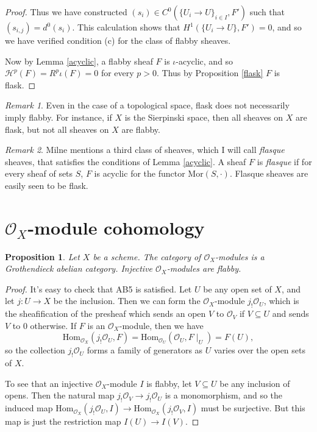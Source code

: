 \documentclass[letterpaper,11pt]{article}
\newtheorem{prop}{Proposition}
\theoremstyle{definition}
\theoremstyle{remark}
\newtheorem{rmk}{Remark}
\begin{document}
\begin{proof}
Thus we have constructed $(s_i)\in C^0(\{U_i \rightarrow U\}_{i\in I}, F')$ such that $(s_{i,j}) = d^0(s_i)$. This calculation shows that $H^1(\{U_i\rightarrow U\}, F') = 0$, and so we have verified condition (c) for the class of flabby sheaves.

Now by Lemma \ref{acyclic}, a flabby sheaf $F$ is $\iota$-acyclic, and so $\mathcal{H}^p(F) = R^p\iota(F) = 0$ for every $p > 0$. Thus by Proposition \ref{flask} $F$ is flask.
\end{proof}

\begin{rmk} Even in the case of a topological space, flask does not necessarily imply flabby. For instance, if $X$ is the Sierpinski space, then all sheaves on $X$ are flask, but not all sheaves on $X$ are flabby.
\end{rmk}

\begin{rmk} Milne \cite{milne} mentions a third class of sheaves, which I will call \emph{flasque} sheaves, that satisfies the conditions of Lemma \ref{acyclic}. A sheaf $F$ is \emph{flasque} if for every sheaf of sets $S$, $F$ is acyclic for the functor $\mbox{Mor}(S,\cdot)$. Flasque sheaves are easily seen to be flask.
\end{rmk}

\section{$\mathcal{O}_X$-module cohomology}

\begin{prop} Let $X$ be a scheme. The category of $\mathcal{O}_X$-modules is a Grothendieck abelian category. Injective $\mathcal{O}_X$-modules are flabby.
\end{prop}
\begin{proof} It's easy to check that AB5 is satisfied. Let $U$ be any open set of $X$, and let $j:U\rightarrow X$ be the inclusion. Then we can form the $\mathcal{O}_X$-module $j_!\mathcal{O}_U$, which is the sheafification of the presheaf which sends an open $V$ to $\mathcal{O}_V$ if $V\subseteq U$ and sends $V$ to $0$ otherwise. If $F$ is an $\mathcal{O}_X$-module, then we have
\[
\mbox{Hom}_{\mathcal{O}_X}(j_!\mathcal{O}_U, F) = \mbox{Hom}_{\mathcal{O}_U}(\mathcal{O}_U, F\mid_U) = F(U),
\]
so the collection $j_!\mathcal{O}_U$ forms a family of generators as $U$ varies over the open sets of $X$.

To see that an injective $\mathcal{O}_X$-module $I$ is flabby, let $V\subseteq U$ be any inclusion of opens. Then the natural map $j_!\mathcal{O}_V \rightarrow j_!\mathcal{O}_U$ is a monomorphism, and so the induced map $\mbox{Hom}_{\mathcal{O}_X}(j_!\mathcal{O}_U, I) \rightarrow \mbox{Hom}_{\mathcal{O}_X}(j_!\mathcal{O}_V, I)$ must be surjective. But this map is just the restriction map $I(U) \rightarrow I(V)$.
\end{proof}
\end{document}
